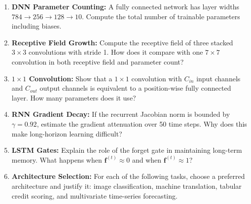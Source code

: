 \begin{enumerate}
    \item \textbf{DNN Parameter Counting:} A fully connected network has layer widths $784 \rightarrow 256 \rightarrow 128 \rightarrow 10$. Compute the total number of trainable parameters including biases.

    \item \textbf{Receptive Field Growth:} Compute the receptive field of three stacked $3\times3$ convolutions with stride 1. How does it compare with one $7\times7$ convolution in both receptive field and parameter count?

    \item \textbf{$1\times1$ Convolution:} Show that a $1\times1$ convolution with $C_{in}$ input channels and $C_{out}$ output channels is equivalent to a position-wise fully connected layer. How many parameters does it use?

    \item \textbf{RNN Gradient Decay:} If the recurrent Jacobian norm is bounded by $\gamma = 0.92$, estimate the gradient attenuation over 50 time steps. Why does this make long-horizon learning difficult?

    \item \textbf{LSTM Gates:} Explain the role of the forget gate in maintaining long-term memory. What happens when $\mathbf{f}^{(t)} \approx 0$ and when $\mathbf{f}^{(t)} \approx 1$?

    \item \textbf{Architecture Selection:} For each of the following tasks, choose a preferred architecture and justify it: image classification, machine translation, tabular credit scoring, and multivariate time-series forecasting.
\end{enumerate}

